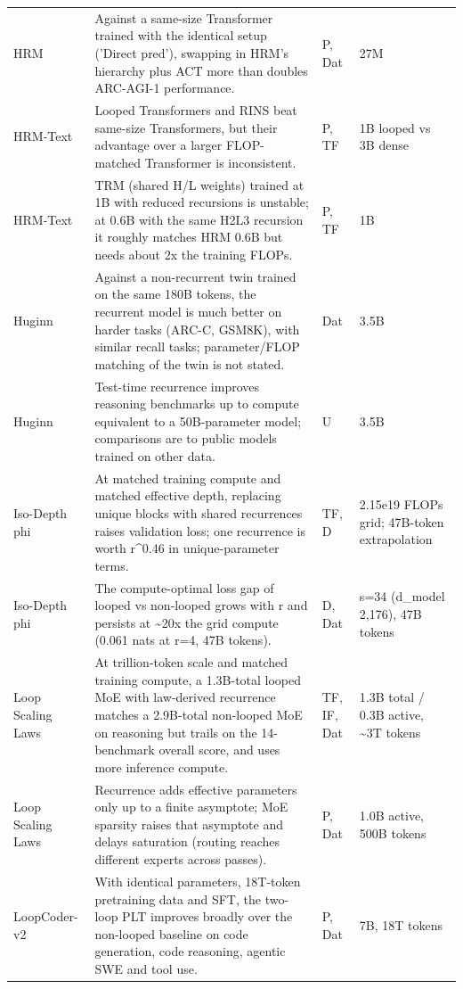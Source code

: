 \begin{longtable}{@{}>{\raggedright\arraybackslash}p{2.7cm}>{\raggedright\arraybackslash}p{7.9cm}>{\raggedright\arraybackslash}p{1.3cm}>{\raggedright\arraybackslash}p{2.5cm}@{}}
HRM~\citep{ax2506.21734} & Against a same-size Transformer trained with the identical setup ('Direct pred'), swapping in HRM's hierarchy plus ACT more than doubles ARC-AGI-1 performance. & P, Dat & 27M \\
HRM-Text~\citep{ax2605.20613} & Looped Transformers and RINS beat same-size Transformers, but their advantage over a larger FLOP-matched Transformer is inconsistent. & P, TF & 1B looped vs 3B dense \\
HRM-Text~\citep{ax2605.20613} & TRM (shared H/L weights) trained at 1B with reduced recursions is unstable; at 0.6B with the same H2L3 recursion it roughly matches HRM 0.6B but needs about 2x the training FLOPs. & P, TF & 1B \\
Huginn~\citep{ax2502.05171} & Against a non-recurrent twin trained on the same 180B tokens, the recurrent model is much better on harder tasks (ARC-C, GSM8K), with similar recall tasks; parameter/FLOP matching of the twin is not stated. & Dat & 3.5B \\
Huginn~\citep{ax2502.05171} & Test-time recurrence improves reasoning benchmarks up to compute equivalent to a 50B-parameter model; comparisons are to public models trained on other data. & U & 3.5B \\
Iso-Depth phi~\citep{ax2604.21106} & At matched training compute and matched effective depth, replacing unique blocks with shared recurrences raises validation loss; one recurrence is worth r\textasciicircum{}0.46 in unique-parameter terms. & TF, D & 2.15e19 FLOPs grid; 47B-token extrapolation \\
Iso-Depth phi~\citep{ax2604.21106} & The compute-optimal loss gap of looped vs non-looped grows with r and persists at \textasciitilde{}20x the grid compute (0.061 nats at r=4, 47B tokens). & D, Dat & s=34 (d\_model 2,176), 47B tokens \\
Loop Scaling Laws~\citep{ax2609.40316} & At trillion-token scale and matched training compute, a 1.3B-total looped MoE with law-derived recurrence matches a 2.9B-total non-looped MoE on reasoning but trails on the 14-benchmark overall score, and uses more inference compute. & TF, IF, Dat & 1.3B total / 0.3B active, \textasciitilde{}3T tokens \\
Loop Scaling Laws~\citep{ax2609.40316} & Recurrence adds effective parameters only up to a finite asymptote; MoE sparsity raises that asymptote and delays saturation (routing reaches different experts across passes). & P, Dat & 1.0B active, 500B tokens \\
LoopCoder-v2~\citep{ax2606.18023} & With identical parameters, 18T-token pretraining data and SFT, the two-loop PLT improves broadly over the non-looped baseline on code generation, code reasoning, agentic SWE and tool use. & P, Dat & 7B, 18T tokens \\

\end{longtable}
